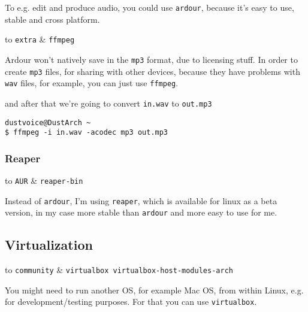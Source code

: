 \documentclass[9pt]{report}
\newenvironment{NOTE}
{\begin{tcolorbox}[colback=admonitionBG,coltitle=draculaFG,colframe=draculaBlue,colbacktitle=draculaBlue,title=NOTE]}
{\end{tcolorbox}}
\newenvironment{packagetable}
{\begin{longtabu}to \textwidth [b]{X[1,r]|X[1,l]}}
{\end{longtabu}}
\begin{document}
To e.g. edit and produce audio, you could use \texttt{ardour}, because it’s easy to use, stable and cross platform.


\begin{NOTE}
    \begin{packagetable}
        \texttt{extra} & \texttt{ffmpeg} \\ 
    \end{packagetable}

    Ardour won’t natively save in the \texttt{mp3} format, due to licensing stuff.
    In order to create \texttt{mp3} files, for sharing with other devices, because they have problems with \texttt{wav} files, for example, you can just use \texttt{ffmpeg}.


    and after that we’re going to convert \texttt{in.wav} to \texttt{out.mp3}


    \begin{verbatim}
dustvoice@DustArch ~
$ ffmpeg -i in.wav -acodec mp3 out.mp3
    \end{verbatim}
\end{NOTE}

\hypertarget{x-reaper}{\subsubsection{Reaper}}
\begin{packagetable}
    \texttt{AUR} & \texttt{reaper-bin} \\ 
\end{packagetable}

Instead of \texttt{ardour}, I’m using \texttt{reaper}, which is available for linux as a beta version, in my case more stable than \texttt{ardour} and more easy to use for me.



\newpage

\hypertarget{x-virtualization}{\subsection{Virtualization}}
\begin{packagetable}
    \texttt{community} & \texttt{virtualbox virtualbox-host-modules-arch} \\ 
\end{packagetable}

You might need to run another OS, for example Mac OS, from within Linux, e.g. for development/testing purposes.
For that you can use \texttt{virtualbox}.
\end{document}
